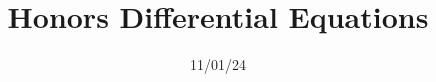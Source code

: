 \documentclass[11pt, letterpaper]{report}
\title{Honors Differential Equations}
\date{11/01/24}
\begin{document}
\makeproblem
\end{document}
